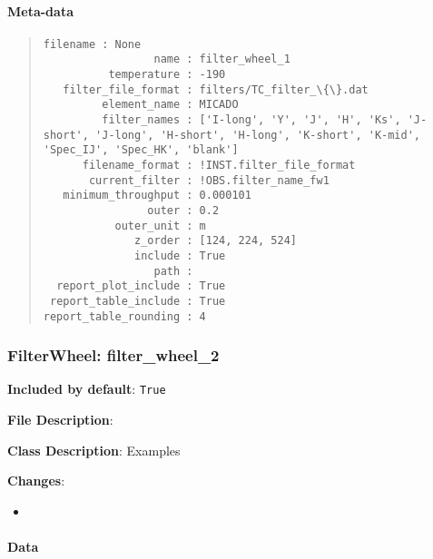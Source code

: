 \paragraph{Meta-data%
  \label{id4}%
}

\begin{quote}
\begin{alltt}
\begin{lstlisting}[frame=single]
             filename : None
                 name : filter_wheel_1
          temperature : -190
   filter_file_format : filters/TC_filter_\{\}.dat
         element_name : MICADO
         filter_names : ['I-long', 'Y', 'J', 'H', 'Ks', 'J-short', 'J-long', 'H-short', 'H-long', 'K-short', 'K-mid', 'Spec_IJ', 'Spec_HK', 'blank']
      filename_format : !INST.filter_file_format
       current_filter : !OBS.filter_name_fw1
   minimum_throughput : 0.000101
                outer : 0.2
           outer_unit : m
              z_order : [124, 224, 524]
              include : True
                 path :
  report_plot_include : True
 report_table_include : True
report_table_rounding : 4
\end{lstlisting}
\end{alltt}
\end{quote}


\subsubsection{FilterWheel: \textquotedbl{}filter\_wheel\_2\textquotedbl{}%
  \label{filterwheel-filter-wheel-2}%
}

\textbf{Included by default}: \texttt{True}

\textbf{File Description}:

\textbf{Class Description}: Examples

\textbf{Changes}:

\begin{itemize}
\item \end{itemize}


\paragraph{Data%
  \label{id5}%
}

\begin{figure}[H]
\noindent{}\label{fig-filter-wheel-2}
\end{figure}

